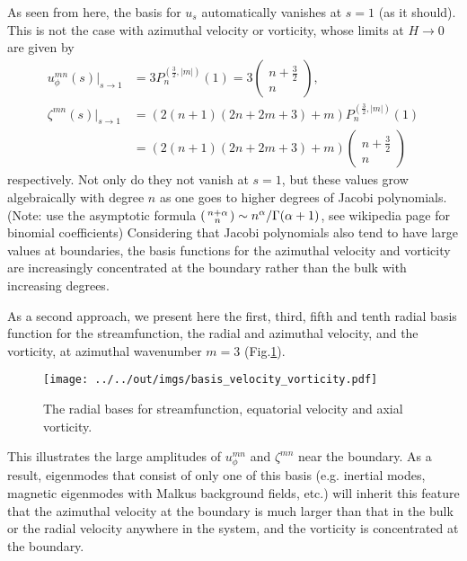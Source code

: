 As seen from here, the basis for $u_s$ automatically vanishes at $s=1$ (as it should). This is not the case with azimuthal velocity or vorticity, whose limits at $H\rightarrow 0$ are given by
\[\begin{aligned}
    u_\phi^{mn}(s)|_{s\rightarrow 1} &= 3 P_n^{(\frac{3}{2}, |m|)}(1) = 3 \begin{pmatrix} n + \frac{3}{2} \\ n \end{pmatrix},\\
    \zeta^{mn}(s)|_{s\rightarrow 1} &= \left(2(n+1)(2n+2m+3) + m\right) P_n^{(\frac{3}{2}, |m|)}(1) \\ 
    &= \left(2(n+1)(2n+2m+3) + m\right) \begin{pmatrix} n + \frac{3}{2} \\ n \end{pmatrix}
\end{aligned}\]
respectively. Not only do they not vanish at $s=1$, but these values grow algebraically with degree $n$ as one goes to higher degrees of Jacobi polynomials. (Note: use the asymptotic formula $\begin{psmallmatrix} n+\alpha \\ n \end{psmallmatrix} \sim n^\alpha/\Gamma(\alpha + 1)$, see wikipedia page for binomial coefficients) 
Considering that Jacobi polynomials also tend to have large values at boundaries, the basis functions for the azimuthal velocity and vorticity are increasingly concentrated at the boundary rather than the bulk with increasing degrees.

As a second approach, we present here the first, third, fifth and tenth radial basis function for the streamfunction, the radial and azimuthal velocity, and the vorticity, at azimuthal wavenumber $m=3$ (Fig.\ref{fig:rad-basis}). 
\begin{figure}[htbp]
    \centering
    \texttt{[image: ../../out/imgs/basis\_velocity\_vorticity.pdf]}
    \caption{The radial bases for streamfunction, equatorial velocity and axial vorticity.}
    \label{fig:rad-basis}
\end{figure}
This illustrates the large amplitudes of $u_\phi^{mn}$ and $\zeta^{mn}$ near the boundary.
As a result, eigenmodes that consist of only one of this basis (e.g. inertial modes, magnetic eigenmodes with Malkus background fields, etc.) will inherit this feature that the azimuthal velocity at the boundary is much larger than that in the bulk or the radial velocity anywhere in the system, and the vorticity is concentrated at the boundary.
